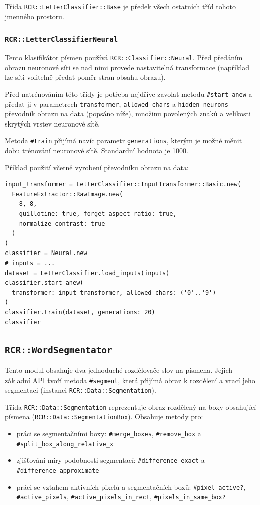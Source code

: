 \documentclass[a4paper]{article}
\begin{document}
Třída \texttt{RCR::LetterClassifier::Base} je předek všech ostatních tříd
tohoto jmenného prostoru.

\subsubsection{\texttt{RCR::LetterClassifierNeural}}
Tento klasifikátor písmen používá \texttt{RCR::Classifier::Neural}.
Před předáním obrazu neuronové síti se nad nimi provede nastavitelná
transformace (například lze síti volitelně předat poměr stran obsahu
obrazu).

Před natrénováním této třídy je potřeba nejdříve zavolat metodu
\texttt{\#start\_anew} a předat ji v parametrech \texttt{transformer},
\texttt{allowed\_chars} a \texttt{hidden\_neurons} převodník obrazu
na data (popsáno níže), množinu povolených znaků a velikosti skrytých
vrstev neuronové sítě.

Metoda \texttt{\#train} přijímá navíc parametr \texttt{generations},
kterým je možné měnit dobu trénování neuronové sítě. Standardní hodnota
je 1000.

Příklad použití včetně vyrobení převodníku obrazu na data:
\begin{lstlisting}
input_transformer = LetterClassifier::InputTransformer::Basic.new(
  FeatureExtractor::RawImage.new(
    8, 8,
    guillotine: true, forget_aspect_ratio: true,
    normalize_contrast: true
  )
)
classifier = Neural.new
# inputs = ...
dataset = LetterClassifier.load_inputs(inputs)
classifier.start_anew(
  transformer: input_transformer, allowed_chars: ('0'..'9')
)
classifier.train(dataset, generations: 20)
classifier
\end{lstlisting}

\subsection{\texttt{RCR::WordSegmentator}}
Tento modul obsahuje dva jednoduché rozdělovače slov na písmena.
Jejich základní API tvoří metoda \texttt{\#segment}, která přijímá obraz k
rozdělení a vrací jeho segmentaci (instanci \texttt{RCR::Data::Segmentation}).

Třída \texttt{RCR::Data::Segmentation} reprezentuje obraz rozdělený
na boxy obsahující písmena (\texttt{RCR::Data::SegmentationBox}).
Obsahuje metody pro:
\begin{itemize}
\item práci se segmentačními boxy:
\texttt{\#merge\_boxes}, \texttt{\#remove\_box} a
\texttt{\#split\_box\_along\_relative\_x}
\item zjišťování míry
podobnosti segmentací: \texttt{\#difference\_exact} a
\texttt{\#difference\_approximate}
\item práci se vztahem
aktivních pixelů a segmentačních boxů: \texttt{\#pixel\_active?},
\texttt{\#active\_pixels}, \texttt{\#active\_pixels\_in\_rect},
\texttt{\#pixels\_in\_same\_box?}
\end{itemize}
\end{document}
